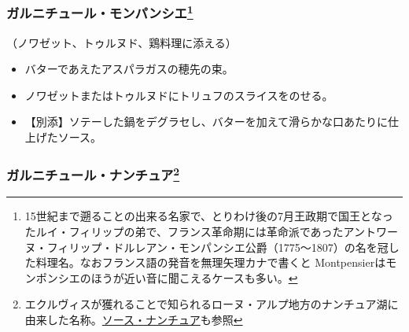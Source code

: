\begin{recette}
\atoaki{}

\hypertarget{garniture-montpensier}{%
\subsubsection[ガルニチュール・モンパンシエ]{\texorpdfstring{ガルニチュール・モンパンシエ\footnote{15世紀まで遡ることの出来る名家で、とりわけ後の7月王政期で国王となったルイ・フィリップの弟で、フランス革命期には革命派であったアントワーヌ・フィリップ・ドルレアン・モンパンシエ公爵（1775〜1807）の名を冠した料理名。なおフランス語の発音を無理矢理カナで書くと
  Montpensierはモンポンシエのほうが近い音に聞こえるケースも多い。}}{ガルニチュール・モンパンシエ}}\label{garniture-montpensier}}



（ノワゼット、トゥルヌド、鶏料理に添える）

\begin{itemize}
\item
  バターであえたアスパラガスの穂先の束。
\item
  ノワゼットまたはトゥルヌドにトリュフのスライスをのせる。
\item
  【別添】ソテーした鍋をデグラセし、バターを加えて滑らかな口あたりに仕上げたソース。
\end{itemize}

\atoaki{}

\hypertarget{garniture-nantua}{%
\subsubsection[ガルニチュール・ナンチュア]{\texorpdfstring{ガルニチュール・ナンチュア\footnote{エクルヴィスが獲れることで知られるローヌ・アルプ地方のナンチュア湖に由来した名称。\protect\hyperlink{sauce-nantua}{ソース・ナンチュア}も参照}}{ガルニチュール・ナンチュア}}\label{garniture-nantua}}




\end{recette}
